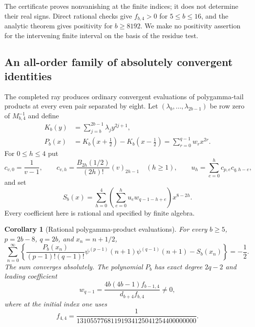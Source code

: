 \documentclass[11pt,a4paper]{article}
\numberwithin{equation}{section}
\newtheorem{corollary}[theorem]{Corollary}
\theoremstyle{definition}
\theoremstyle{remark}
\begin{document}
The certificate proves nonvanishing at the finite indices; it does
not determine their real signs.  Direct rational checks give
$f_{b,4}>0$ for $5\le b\le16$, and the analytic theorem gives
positivity for $b\ge8192$.  We make no positivity assertion for
the intervening finite interval on the basis of the residue test.

\subsection{An all-order family of absolutely convergent identities}

The completed ray produces ordinary convergent evaluations of
polygamma-tail products at every even pair separated by eight.
Let $(\lambda_b,\ldots,\lambda_{2b-1})$ be row zero of
$M_{b,4}^{-1}$ and define
\begin{align*}
 K_b(y)&=\sum_{j=b}^{2b-1}\lambda_jy^{2j+1},\\
 P_b(x)&=K_b(x+\tfrac12)-K_b(x-\tfrac12)
             =\sum_{r=0}^{q-1}w_rx^{2r}.
\end{align*}
For $0\le h\le4$ put
\[
 c_{v,0}=\frac1{v-1},\qquad
 c_{v,h}=\frac{B_{2h}(1/2)}{(2h)!}(v)_{2h-1}\quad(h\ge1),
 \qquad u_h=\sum_{e=0}^h c_{p,e}c_{q,h-e},
\]
and set
\[
 S_b(x)=\sum_{h=0}^4
       \left(\sum_{e=0}^h u_e w_{q-1-h+e}\right)x^{8-2h}.
\]
Every coefficient here is rational and specified by finite algebra.

\begin{corollary}[Rational polygamma-product evaluations]
\label{eg:eight-identities}
For every $b\ge5$, $p=2b-8$, $q=2b$, and $x_n=n+1/2$,
\begin{equation}\label{eg:eight-sum}
 \boxed{\displaystyle
 \sum_{n=0}^{\infty}\left\{
 \frac{P_b(x_n)}{(p-1)!(q-1)!}
       \psi^{(p-1)}(n+1)\psi^{(q-1)}(n+1)-S_b(x_n)
                         \right\}=-\frac12.}
\end{equation}
The sum converges absolutely.  The polynomial $P_b$ has exact degree
$2q-2$ and leading coefficient
\begin{equation}\label{eg:leading}
 w_{q-1}=\frac{4b(4b-1)f_{b-1,4}}{d_{b+4}f_{b,4}}\ne0,
\end{equation}
where at the initial index one uses
\[
 f_{4,4}=\frac1{13105577681191934125041254400000000}.
\]
\end{corollary}
\end{document}
